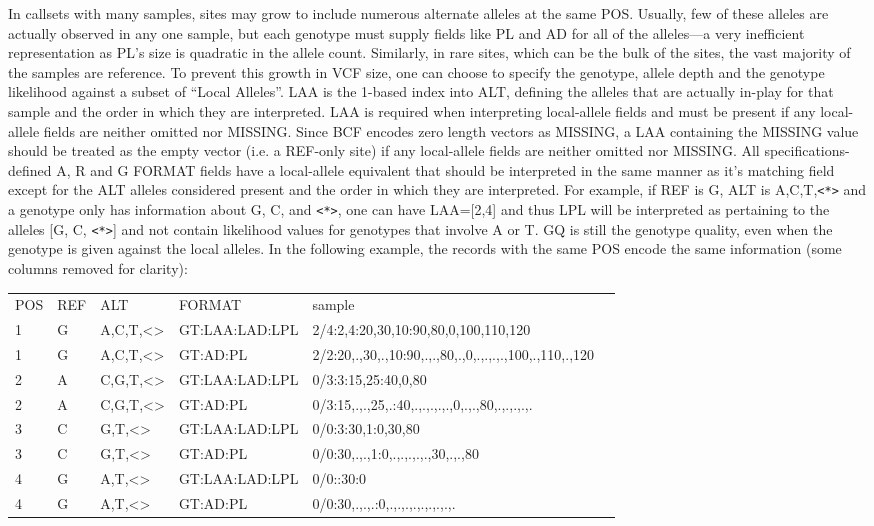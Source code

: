 \documentclass[8pt]{article}
\begin{document}
\begin{itemize}
  In callsets with many samples, sites may grow to include numerous alternate alleles at the same POS.
  Usually, few of these alleles are actually observed in any one sample, but each genotype must supply fields like PL and AD for all of the alleles---a very inefficient representation as PL's size is quadratic in the allele count.
  Similarly, in rare sites, which can be the bulk of the sites, the vast majority of the samples are reference.
  To prevent this growth in VCF size, one can choose to specify the genotype, allele depth and the genotype likelihood against a subset of ``Local Alleles''.
  LAA is the 1-based index into ALT, defining the alleles that are actually in-play for that sample and the order in which they are interpreted.
  LAA is required when interpreting local-allele fields and must be present if any local-allele fields are neither omitted nor MISSING.
  Since BCF encodes zero length vectors as MISSING, a LAA containing the MISSING value should be treated as the empty vector (i.e. a REF-only site) if any local-allele fields are neither omitted nor MISSING.
  All specifications-defined A, R and G FORMAT fields have a local-allele equivalent that should be interpreted in the same manner as it's matching field except for the ALT alleles considered present and the order in which they are interpreted.
  For example, if REF is G, ALT is A,C,T,\verb!<*>! and a genotype only has information about G, C, and \verb!<*>!, one can have LAA=[2,4] and thus LPL will be interpreted as pertaining to the alleles [G, C, \verb!<*>!] and not contain likelihood values for genotypes that involve A or T.
  GQ is still the genotype quality, even when the genotype is given against the local alleles.
  In the following example, the records with the same POS encode the same information (some columns removed for clarity):

  \vspace{0.5em}
  \begin{tabular}[l]{llllll}
  	POS &REF&  ALT&FORMAT&sample\\
  	1&G&A,C,T,\textless*\textgreater& GT:LAA:LAD:LPL&  2/4:2,4:20,30,10:90,80,0,100,110,120\\
  	1&G&A,C,T,\textless*\textgreater& GT:AD:PL&  2/2:20,.,30,.,10:90,.,.,80,.,0,.,.,.,.,100,.,110,.,120\\
  	2&A&C,G,T,\textless*\textgreater& GT:LAA:LAD:LPL& 0/3:3:15,25:40,0,80\\
  	2&A&C,G,T,\textless*\textgreater& GT:AD:PL&0/3:15,.,.,25,.:40,.,.,.,.,.,0,.,.,80,.,.,.,.,.\\
  	3&C&G,T,\textless*\textgreater& GT:LAA:LAD:LPL& 0/0:3:30,1:0,30,80\\
  	3&C&G,T,\textless*\textgreater& GT:AD:PL& 0/0:30,.,.,1:0,.,.,.,.,.,30,.,.,80\\
  	4&G&A,T,\textless*\textgreater& GT:LAA:LAD:LPL& 0/0::30:0\\
  	4&G&A,T,\textless*\textgreater& GT:AD:PL& 0/0:30,.,.,.:0,.,.,.,.,.,.,.,.,.\\
  \end{tabular}


\end{itemize}
\end{document}
